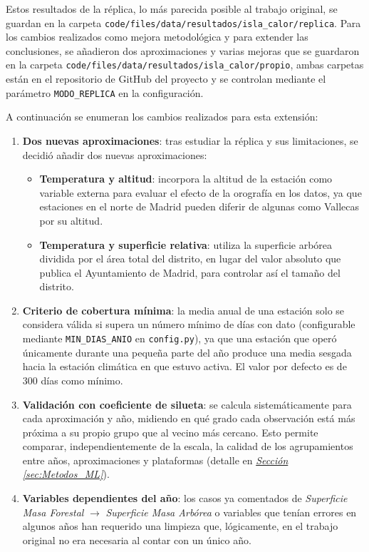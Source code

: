 Estos resultados de la réplica, lo más parecida posible al trabajo original, se guardan en la carpeta \texttt{code/files/data/resultados/isla\_calor/replica}. Para los cambios realizados como mejora metodológica y para extender las conclusiones, se añadieron dos aproximaciones y varias mejoras que se guardaron en la carpeta \texttt{code/files/data/resultados/isla\_calor/propio}, ambas carpetas están en el repositorio de GitHub del proyecto y se controlan mediante el parámetro \texttt{MODO\_REPLICA} en la configuración.

A continuación se enumeran los cambios realizados para esta extensión:
\begin{enumerate}
	\item \textbf{Dos nuevas aproximaciones}: tras estudiar la réplica y sus limitaciones, se decidió añadir dos nuevas aproximaciones:
	\begin{itemize}	
		\item \textbf{Temperatura y altitud}: incorpora la altitud de la estación como variable externa para evaluar el efecto de la orografía en los datos, ya que estaciones en el norte de Madrid pueden diferir de algunas como Vallecas por su altitud.
		\item \textbf{Temperatura y superficie relativa}: utiliza la superficie arbórea dividida por el área total del distrito, en lugar del valor absoluto que publica el Ayuntamiento de Madrid, para controlar así el tamaño del distrito.
	\end{itemize}
	\item \textbf{Criterio de cobertura mínima}: la media anual de una estación solo se considera válida si supera un número mínimo de días con dato (configurable mediante \texttt{MIN\_DIAS\_ANIO} en \texttt{config.py}), ya que una estación que operó únicamente durante una pequeña parte del año produce una media sesgada hacia la estación climática en que estuvo activa. El valor por defecto es de 300 días como mínimo.
	\item \textbf{Validación con coeficiente de silueta}: se calcula sistemáticamente para cada aproximación y año, midiendo en qué grado cada observación está más próxima a su propio grupo que al vecino más cercano. Esto permite comparar, independientemente de la escala, la calidad de los agrupamientos entre años, aproximaciones y plataformas (detalle en \hyperref[sec:Metodos_ML]{\textit{Sección \ref*{sec:Metodos_ML}}}).
	\item \textbf{Variables dependientes del año}: los casos ya comentados de \emph{Superficie Masa Forestal} $\to$ \emph{Superficie Masa Arbórea} o variables que tenían errores en algunos años han requerido una limpieza que, lógicamente, en el trabajo original no era necesaria al contar con un único año.
\end{enumerate}

